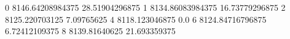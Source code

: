 0 8146.64208984375 28.51904296875
1 8134.86083984375 16.73779296875
2 8125.220703125 7.09765625
4 8118.123046875 0.0
6 8124.84716796875 6.72412109375
8 8139.81640625 21.693359375
